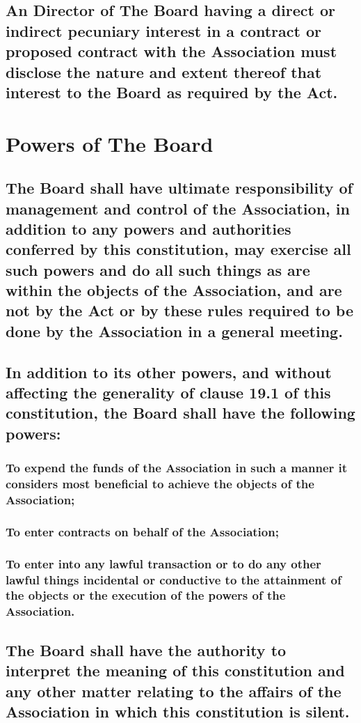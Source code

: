 \documentclass{article}
\newenvironment{subs}
  {\adjustwidth{2em}{0pt}}
  {\endadjustwidth}
\begin{document}
\begin{subs}
\begin{subs}
\begin{subs}
\subsection{An Director of The Board having a direct or indirect pecuniary interest in a contract or proposed contract with the Association must disclose the nature and extent thereof that interest to the Board as required by the Act.}
\end{subs}

\section{Powers of The Board}
\begin{subs}
\subsection{The Board shall have ultimate responsibility of management and control of the Association, in addition to any powers and authorities conferred by this constitution, may exercise all such powers and do all such things as are within the objects of the Association, and are not by the Act or by these rules required to be done by the Association in a general meeting.}
\subsection{In addition to its other powers, and without affecting the generality of clause 19.1 of this constitution, the Board shall have the following powers:}
\begin{subs}
\subsubsection{To expend the funds of the Association in such a manner it considers most beneficial to achieve the objects of the Association;}
\subsubsection{To enter contracts on behalf of the Association;}
\subsubsection{To enter into any lawful transaction or to do any other lawful things incidental or conductive to the attainment of the objects or the execution of the powers of the Association.}
\subsection{The Board shall have the authority to interpret the meaning of this constitution and any other matter relating to the affairs of the Association in which this constitution is silent.}
\end{subs}
\end{subs}


\end{subs}
\end{subs}
\end{document}

